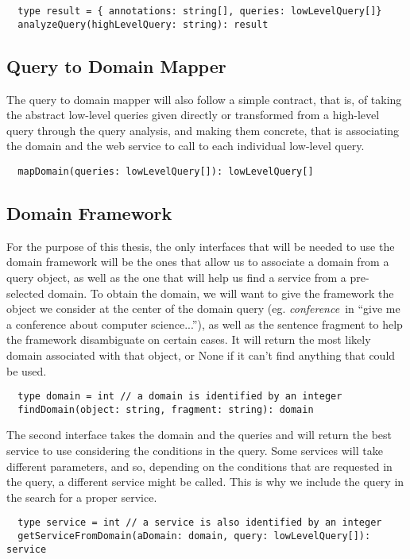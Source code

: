 \begin{verbatim}
  type result = { annotations: string[], queries: lowLevelQuery[]}
  analyzeQuery(highLevelQuery: string): result
\end{verbatim}


\subsection{Query to Domain Mapper} %
\label{sub:query_to_domain_mapper_int}

The query to domain mapper will also follow a simple contract, that is, of taking the abstract low-level queries given directly or transformed from a high-level query through the query analysis, and making them concrete, that is associating the domain and the web service to call to each individual low-level query.

\begin{verbatim}
  mapDomain(queries: lowLevelQuery[]): lowLevelQuery[]
\end{verbatim}


\subsection{Domain Framework} %
\label{sub:domain_framework}

For the purpose of this thesis, the only interfaces that will be needed to use the domain framework will be the ones that allow us to associate a domain from a query object, as well as the one that will help us find a service from a pre-selected domain. To obtain the domain, we will want to give the framework the object we consider at the center of the domain query (eg. \emph{conference}\ in ``give me a conference about computer science...''), as well as the sentence fragment to help the framework disambiguate on certain cases. It will return the most likely domain associated with that object, or None if it can't find anything that could be used.

\begin{verbatim}
  type domain = int // a domain is identified by an integer
  findDomain(object: string, fragment: string): domain
\end{verbatim}

The second interface takes the domain and the queries and will return the best service to use considering the conditions in the query. Some services will take different parameters, and so, depending on the conditions that are requested in the query, a different service might be called. This is why we include the query in the search for a proper service.

\begin{verbatim}
  type service = int // a service is also identified by an integer
  getServiceFromDomain(aDomain: domain, query: lowLevelQuery[]): service
\end{verbatim}



